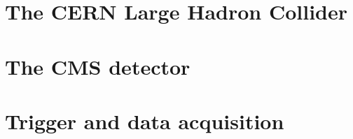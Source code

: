 \section{The CERN Large Hadron Collider}

\section{The CMS detector}

\section{Trigger and data acquisition}
